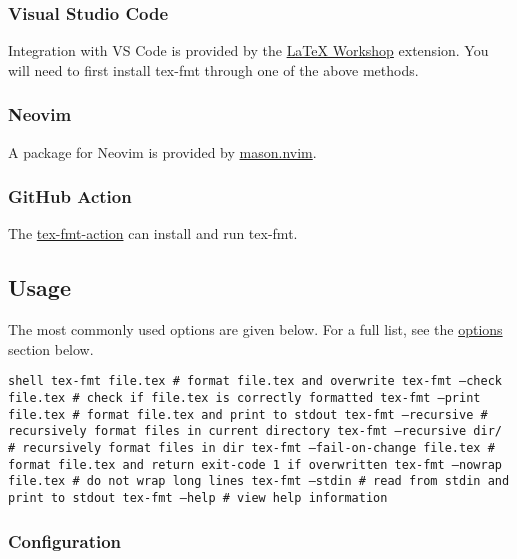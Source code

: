 \documentclass{scrartcl}
\begin{document}
\subsubsection{Visual Studio Code}\hypertarget{visual-studio-code}{}\label{visual-studio-code}

Integration with VS Code is provided by the
\href{https://github.com/James-Yu/LaTeX-Workshop}{LaTeX Workshop}
extension. You will need to first install tex-fmt
through one of the above methods.

\subsubsection{Neovim}\hypertarget{neovim}{}\label{neovim}

A package for Neovim is provided by
\href{https://github.com/williamboman/mason.nvim}{mason.nvim}.

\subsubsection{GitHub Action}\hypertarget{github-action}{}\label{github-action}

The \href{https://github.com/grayespinoza/tex-fmt-action}{tex-fmt-action} can install and run tex-fmt.

\subsection{Usage}\hypertarget{usage}{}\label{usage}

The most commonly used options are given below.
For a full list, see the
\href{https://github.com/WGUNDERWOOD/tex-fmt?tab=readme-ov-file#options}{options}
section below.

\texttt{shell
tex-fmt file.tex                   \# format file.tex and overwrite
tex-fmt --check file.tex           \# check if file.tex is correctly formatted
tex-fmt --print file.tex           \# format file.tex and print to stdout
tex-fmt --recursive                \# recursively format files in current directory
tex-fmt --recursive dir/           \# recursively format files in dir
tex-fmt --fail-on-change file.tex  \# format file.tex and return exit-code 1 if overwritten
tex-fmt --nowrap file.tex          \# do not wrap long lines
tex-fmt --stdin                    \# read from stdin and print to stdout
tex-fmt --help                     \# view help information
}

\subsubsection{Configuration}\hypertarget{configuration}{}\label{configuration}
\end{document}
